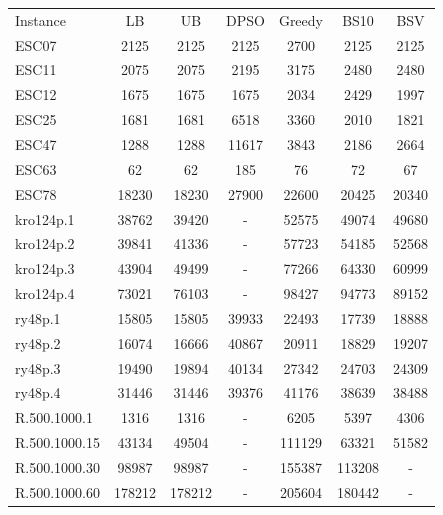 \documentclass[]{article}
\begin{document}
	\begin{table}[H]
		\begin{tabular}{lcccccc}
			Instance       & LB     &    UB      & DPSO   &   Greedy &   BS10   &   BSV   \\
			ESC07          & 2125   &    2125    & 2125   &   2700   &   2125   &   2125  \\
			ESC11          & 2075   &    2075    & 2195   &   3175   &   2480   &   2480  \\
			ESC12          & 1675   &    1675    & 1675   &   2034   &   2429   &   1997  \\
			ESC25          & 1681   &    1681    & 6518   &   3360   &   2010   &   1821  \\
			ESC47          & 1288   &    1288    & 11617  &   3843   &   2186   &   2664  \\
			ESC63          & 62     &    62      & 185    &   76     &   72     &   67    \\
			ESC78          & 18230  &    18230   & 27900  &   22600  &   20425  &   20340 \\
			kro124p.1      & 38762  &    39420   & -      &   52575  &   49074  &   49680 \\
			kro124p.2      & 39841  &    41336   & -      &   57723  &   54185  &   52568 \\
			kro124p.3      & 43904  &    49499   & -      &   77266  &   64330  &   60999 \\
			kro124p.4      & 73021  &    76103   & -      &   98427  &   94773  &   89152 \\
			ry48p.1        & 15805  &    15805   & 39933  &   22493  &   17739  &   18888 \\
			ry48p.2        & 16074  &    16666   & 40867  &   20911  &   18829  &   19207 \\
			ry48p.3        & 19490  &    19894   & 40134  &   27342  &   24703  &   24309 \\
			ry48p.4        & 31446  &    31446   & 39376  &   41176  &   38639  &   38488 \\
			R.500.1000.1   & 1316   &    1316    & -      &   6205   &   5397   &   4306  \\
			R.500.1000.15  & 43134  &    49504   & -      &   111129 &   63321  &   51582 \\
			R.500.1000.30  & 98987  &    98987   & -      &   155387 &   113208 &   -     \\
			R.500.1000.60  & 178212 &    178212  & -      &   205604 &   180442 &   -     \\

\end{tabular}
\end{table}
\end{document}
